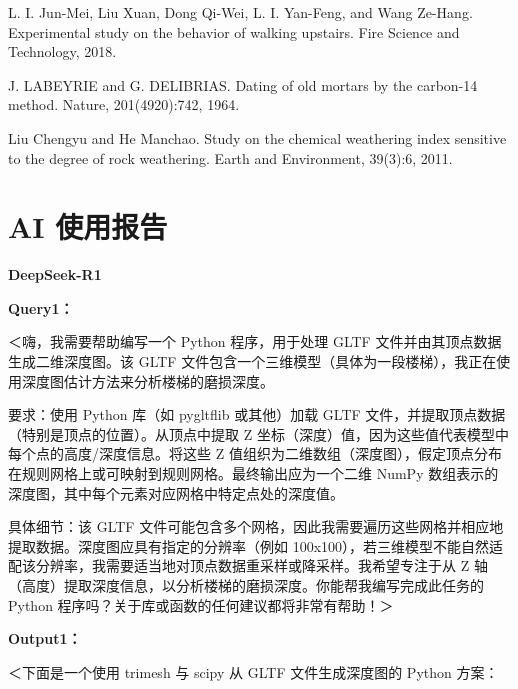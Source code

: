 \documentclass[11pt,a4paper]{ctexart}
\begin{document}
\begin{enumerate}[label={[\arabic*]},leftmargin=2.6em,itemsep=2pt,topsep=2pt]
\item L. I. Jun-Mei, Liu Xuan, Dong Qi-Wei, L. I. Yan-Feng, and Wang Ze-Hang. Experimental study on the behavior of walking upstairs. Fire Science and Technology, 2018.
\item J. LABEYRIE and G. DELIBRIAS. Dating of old mortars by the carbon-14 method. Nature, 201(4920):742, 1964.
\item Liu Chengyu and He Manchao. Study on the chemical weathering index sensitive to the degree of rock weathering. Earth and Environment, 39(3):6, 2011.
\end{enumerate}

\newpage
\section*{AI 使用报告}

\noindent\textbf{DeepSeek-R1}

\noindent\textbf{Query1：}

＜嗨，我需要帮助编写一个 Python 程序，用于处理 GLTF 文件并由其顶点数据生成二维深度图。该 GLTF 文件包含一个三维模型（具体为一段楼梯），我正在使用深度图估计方法来分析楼梯的磨损深度。

要求：使用 Python 库（如 pygltflib 或其他）加载 GLTF 文件，并提取顶点数据（特别是顶点的位置）。从顶点中提取 Z 坐标（深度）值，因为这些值代表模型中每个点的高度/深度信息。将这些 Z 值组织为二维数组（深度图），假定顶点分布在规则网格上或可映射到规则网格。最终输出应为一个二维 NumPy 数组表示的深度图，其中每个元素对应网格中特定点处的深度值。

具体细节：该 GLTF 文件可能包含多个网格，因此我需要遍历这些网格并相应地提取数据。深度图应具有指定的分辨率（例如 100x100），若三维模型不能自然适配该分辨率，我需要适当地对顶点数据重采样或降采样。我希望专注于从 Z 轴（高度）提取深度信息，以分析楼梯的磨损深度。你能帮我编写完成此任务的 Python 程序吗？关于库或函数的任何建议都将非常有帮助！＞

\noindent\textbf{Output1：}

＜下面是一个使用 trimesh 与 scipy 从 GLTF 文件生成深度图的 Python 方案：
\end{document}
